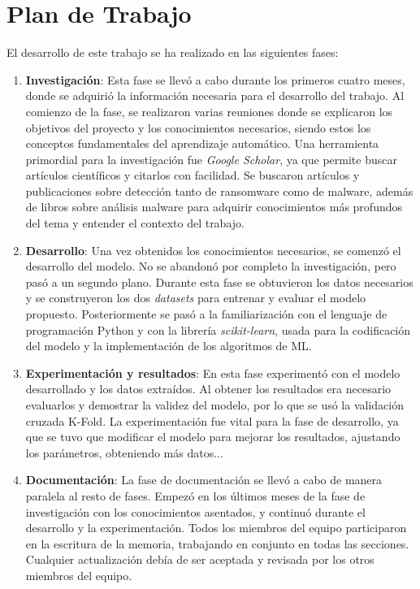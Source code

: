 \section{Plan de Trabajo}
\noindent El desarrollo de este trabajo se ha realizado en las siguientes fases:
\begin{enumerate}
    \item \textbf{Investigación}: Esta fase se llevó a cabo durante los primeros cuatro meses, donde se adquirió la información necesaria para el desarrollo del trabajo. Al comienzo de la fase, se realizaron varias reuniones donde se explicaron los objetivos del proyecto y los conocimientos necesarios, siendo estos los conceptos fundamentales del aprendizaje automático. Una herramienta primordial para la investigación fue \textit{Google Scholar}, ya que permite buscar artículos científicos y citarlos con facilidad. Se buscaron artículos y publicaciones sobre detección tanto de ransomware como de malware, además de libros sobre análisis malware para adquirir conocimientos más profundos del tema y entender el contexto del trabajo.
    \item \textbf{Desarrollo}: Una vez obtenidos los conocimientos necesarios, se comenzó el desarrollo del modelo. No se abandonó por completo la investigación, pero pasó a un segundo plano. Durante esta fase se obtuvieron los datos necesarios y se construyeron los dos \textit{datasets} para entrenar y evaluar el modelo propuesto. Posteriormente se pasó a la familiarización con el lenguaje de programación Python y con la librería \textit{scikit-learn}, usada para la codificación del modelo y la implementación de los algoritmos de \gls{ML}.
    \item \textbf{Experimentación y resultados}: En esta fase experimentó con el modelo desarrollado y los datos extraídos. Al obtener los resultados era necesario evaluarlos y demostrar la validez del modelo, por lo que se usó la validación cruzada K-Fold. La experimentación fue vital para la fase de desarrollo, ya que se tuvo que modificar el modelo para mejorar los resultados, ajustando los parámetros, obteniendo más datos...
    \item \textbf{Documentación}: La fase de documentación se llevó a cabo de manera paralela al resto de fases. Empezó en los últimos meses de la fase de investigación con los conocimientos asentados, y continuó durante el desarrollo y la experimentación. Todos los miembros del equipo participaron en la escritura de la memoria, trabajando en conjunto en todas las secciones. Cualquier actualización debía de ser aceptada y revisada por los otros miembros del equipo.
\end{enumerate}

